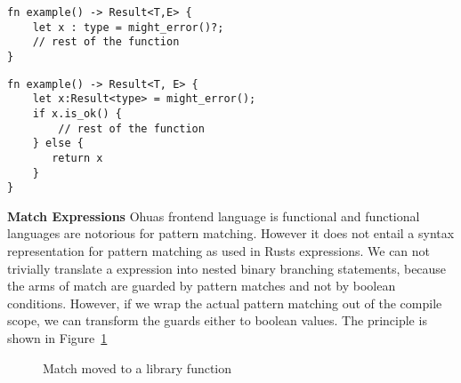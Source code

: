 \begin{verbatim}
fn example() -> Result<T,E> {
    let x : type = might_error()?;
    // rest of the function
}
\end{verbatim}

\begin{verbatim}
fn example() -> Result<T, E> {
    let x:Result<type> = might_error();
    if x.is_ok() {
        // rest of the function
    } else {
       return x 
    }   
}
\end{verbatim}


\textbf{Match Expressions}
 Ohuas  frontend language is functional and functional languages are notorious for pattern matching. However it does not entail a syntax representation for pattern matching as used in Rusts  expressions. We can not trivially translate a  expression into nested binary branching statements, because the arms of match are guarded by pattern matches and not by boolean conditions. However, if we wrap the actual pattern matching out of the compile scope, we can transform the guards either to boolean values. The principle is shown in Figure~\ref{fig:MatchHandling}\\

\begin{figure}[H]
\centering
\tabskip=0pt
\caption{Match moved to a library function}
\label{fig:MatchHandling}
\end{figure}

